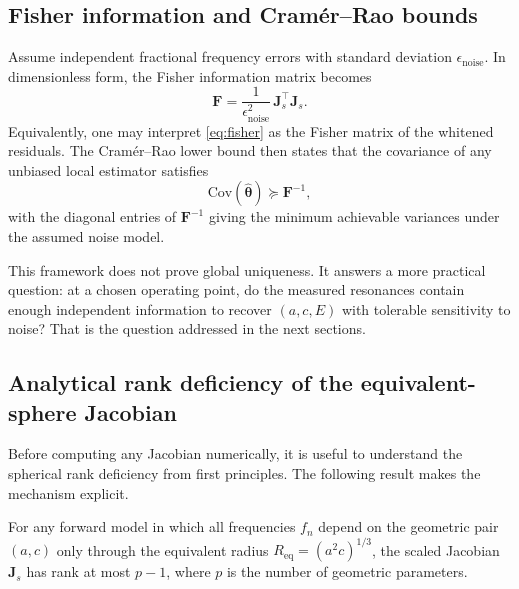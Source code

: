 \subsection{Fisher information and Cram\'er--Rao bounds}

Assume independent fractional frequency errors with standard deviation
$\epsilon_\mathrm{noise}$.  In dimensionless form, the Fisher information
matrix becomes
\begin{equation}\label{eq:fisher}
  \mathbf{F}
  =
  \frac{1}{\epsilon_\mathrm{noise}^2}\,
  \mathbf{J}_s^\top \mathbf{J}_s.
\end{equation}
Equivalently, one may interpret \eqref{eq:fisher} as the Fisher matrix of the
whitened residuals.  The Cram\'er--Rao lower bound then states that the
covariance of any unbiased local estimator satisfies
\begin{equation}\label{eq:crlb}
  \mathrm{Cov}(\hat{\boldsymbol{\theta}})
  \succeq
  \mathbf{F}^{-1},
\end{equation}
with the diagonal entries of $\mathbf{F}^{-1}$ giving the minimum achievable
variances under the assumed noise model.

This framework does not prove global uniqueness.  It answers a more practical
question: at a chosen operating point, do the measured resonances contain enough
independent information to recover $(a,c,E)$ with tolerable sensitivity to
noise?  That is the question addressed in the next sections.

\subsection{Analytical rank deficiency of the equivalent-sphere Jacobian}

Before computing any Jacobian numerically, it is useful to understand the
spherical rank deficiency from first principles.  The following result makes the
mechanism explicit.

\begin{proposition}\label{prop:chain_rule}
For any forward model in which all frequencies $f_n$ depend on the geometric
pair $(a,c)$ only through the equivalent radius
$R_\mathrm{eq} = (a^2 c)^{1/3}$, the scaled Jacobian $\mathbf{J}_s$ has rank
at most $p-1$, where $p$ is the number of geometric parameters.
\end{proposition}

